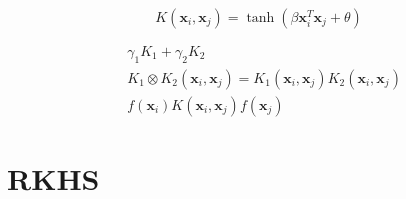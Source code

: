 \documentclass[a4paper,12pt]{article}
\begin{document}
        \begin{equation}
            K(\bm{x}_i,\bm{x}_j)=\tanh(\beta\bm{x}_i^T\bm{x}_j+\theta)
        \end{equation}

        \begin{equation}
            \begin{split}
                &\gamma_1K_1+\gamma_2K_2\\
                &K_1\otimes K_2(\bm{x}_i,\bm{x}_j)=K_1(\bm{x}_i,\bm{x}_j)K_2(\bm{x}_i,\bm{x}_j)\\
                &f(\bm{x}_i)K(\bm{x}_i,\bm{x}_j)f(\bm{x}_j)
            \end{split}
        \end{equation}

    \section{RKHS}
\end{document}
